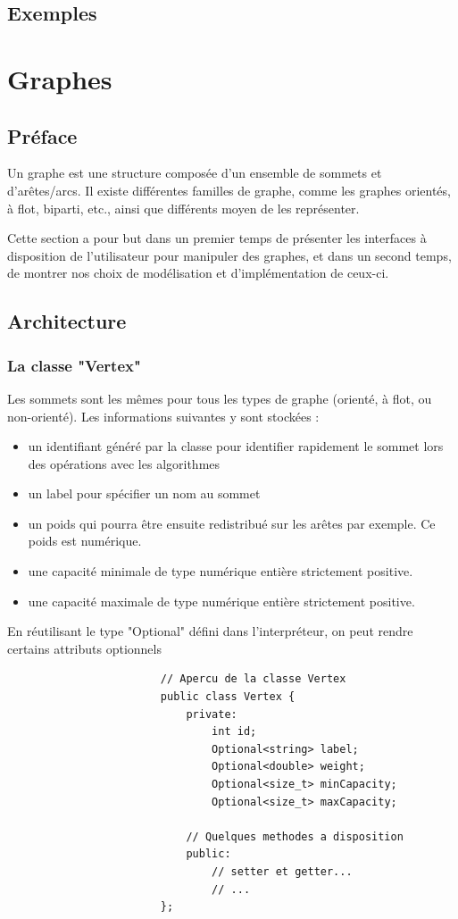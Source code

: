 \documentclass[french]{article}
\begin{document}
		\subsection{Exemples}
		
	\section{Graphes}
	\label{sec:graphes}
		\subsection{Préface}
		Un graphe est une structure composée d'un ensemble de sommets et d'arêtes/arcs. Il existe différentes familles de graphe, comme les graphes orientés, à flot, biparti, etc., ainsi que différents moyen de les représenter.
		
		Cette section a pour but dans un premier temps de présenter les interfaces à disposition de l'utilisateur pour manipuler des graphes, et dans un second temps, de montrer nos choix de modélisation et d'implémentation de ceux-ci.
		
		\subsection{Architecture}
		
		
			\subsubsection{La classe "Vertex"}
			Les sommets sont les mêmes pour tous les types de graphe (orienté, à flot, ou non-orienté). Les informations suivantes y sont stockées :
			\begin{itemize}
				\item un identifiant généré par la classe pour identifier rapidement le sommet lors des opérations avec les algorithmes
				\item un label pour spécifier un nom au sommet
				\item un poids qui pourra être ensuite redistribué sur les arêtes par exemple. Ce poids est numérique.
				\item une capacité minimale de type numérique entière strictement positive.
				\item une capacité maximale de type numérique entière strictement positive. 
			\end{itemize}
			En réutilisant le type "Optional" défini dans l'interpréteur, on peut rendre certains attributs optionnels
			\begin{lstlisting}
						// Apercu de la classe Vertex
						public class Vertex {
							private:
								int id;
								Optional<string> label;
								Optional<double> weight;
								Optional<size_t> minCapacity;
								Optional<size_t> maxCapacity;
								
							// Quelques methodes a disposition
							public:
								// setter et getter...
								// ...
						};
			\end{lstlisting}
			
\end{document}
